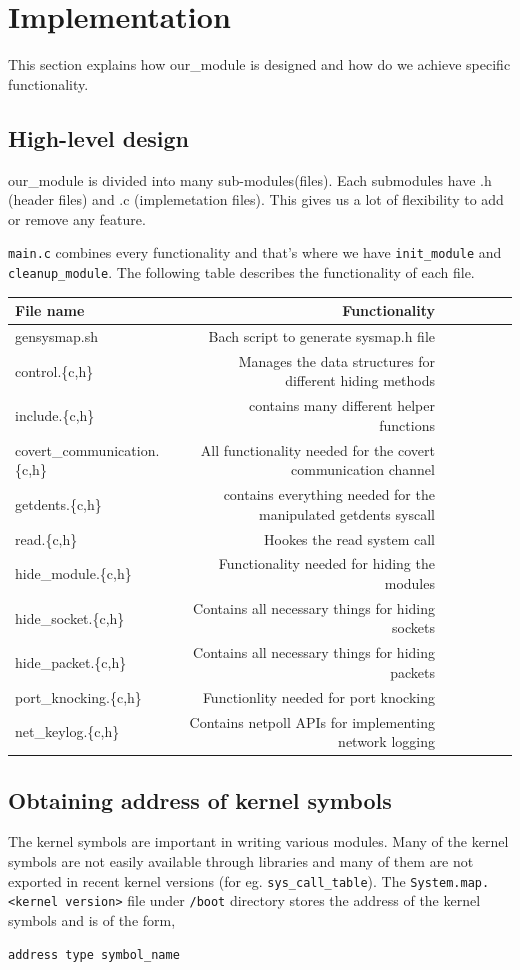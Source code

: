 \documentclass[10pt, letterpaper]{scrartcl}
\begin{document}
\section{Implementation}
This section explains how our\_module is designed and how do we achieve specific functionality. 

\subsection{High-level design}
our\_module is divided into many sub-modules(files). Each submodules have .h (header files) and .c (implemetation files).
This gives us a lot of flexibility to add or remove any feature.

\texttt{main.c} combines every functionality and that's where we have \texttt{init\_module} and \texttt{cleanup\_module}.
The following table describes the functionality of each file.



\begin{tabular}{l*{6}r}
File name             & Functionality \\
\hline
gensysmap.sh & Bach script to generate sysmap.h file\\
control.\{c,h\} & Manages the data structures for different hiding methods\\
include.\{c,h\} & contains many different helper functions   \\
covert\_communication.\{c,h\} & All functionality needed for the covert communication channel \\
getdents.\{c,h\} & contains everything needed for the manipulated getdents syscall\\
read.\{c,h\} & Hookes the read system call \\
hide\_module.\{c,h\} & Functionality needed for hiding the modules\\
hide\_socket.\{c,h\} & Contains all necessary things for hiding sockets\\
hide\_packet.\{c,h\} & Contains all necessary things for hiding packets\\
port\_knocking.\{c,h\} & Functionlity needed for port knocking\\
net\_keylog.\{c,h\} & Contains netpoll APIs for implementing network logging\\

\end{tabular}




\subsection{Obtaining address of kernel symbols}
The kernel symbols are important in writing various modules. Many of the kernel symbols are not easily available through libraries 
and many of them are not exported in recent kernel versions (for eg. \texttt{sys\_call\_table}).
The \texttt{System.map.<kernel version>} file under \texttt{/boot} directory stores the address of the kernel symbols and is of the form, 
\begin{verbatim}
address type symbol_name
\end{verbatim}
\end{document}
